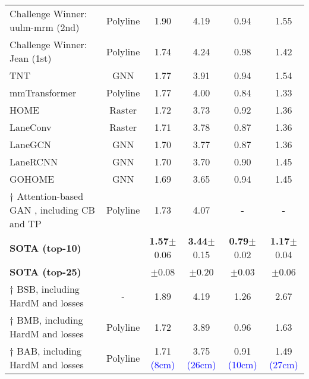 \begin{table}
{\begin{tabular}{l c c c c c}
		Challenge Winner: uulm-mrm (2nd) \cite{chang2019argoverse} & Polyline & 1.90 & 4.19 & 0.94 & 1.55 \\
		Challenge Winner: Jean (1st) \cite{mercat2020multi, chang2019argoverse} & Polyline & 1.74 & 4.24 & 0.98 & 1.42 \\
		TNT~\cite{zhao2021tnt} & \ac{GNN} & 1.77 & 3.91 & 0.94 & 1.54 \\
		mmTransformer~\cite{liu2021multimodal} & Polyline & 1.77 & 4.00 & 0.84 &  1.33 \\
		HOME~\cite{gilles2021home} & Raster & 1.72 & 3.73 & 0.92 & 1.36 \\
		LaneConv~\cite{deo2018convolutionalmotion} & Raster & 1.71 & 3.78 & 0.87 & 1.36 \\
		LaneGCN~\cite{liang2020learning} & \ac{GNN} & 1.70 & 3.77 & 0.87 & 1.36 \\
		LaneRCNN~\cite{zeng2021lanercnn} & \ac{GNN} & 1.70 & 3.70 & 0.90 & 1.45 \\
		GOHOME~\cite{gilles2022gohome} & \ac{GNN} & 1.69 & 3.65 & 0.94 & 1.45 \\
		$\dag$ Attention-based \ac{GAN} \cite{gomez2022exploring}, including CB and TP & Polyline & 1.73 & 4.07 & - & - \\
		\textbf{\ac{SOTA} (top-10)}~\cite{gilles2022gohome, liu2021multimodal, varadarajan2022multipath++, ye2021tpcn} &  & \textbf{1.57}$\pm$0.06 &  \textbf{3.44}$\pm$0.15 & \textbf{0.79}$\pm$0.02 & \textbf{1.17}$\pm$0.04  \\
		\textbf{\ac{SOTA} (top-25)}~\cite{gilles2022gohome, liu2021multimodal, varadarajan2022multipath++, ye2021tpcn} &  & \boldblue{1.63}$\pm$0.08 & \boldblue{3.59}$\pm$0.20 & \boldblue{0.81}$\pm$0.03 & \boldblue{1.22}$\pm$0.06  \\
		\midrule
		$\dag$ \ac{BSB}, including \ac{HardM} and losses & - & 1.89 & 4.19 & 1.26 & 2.67 \\
		$\dag$ \ac{BMB}, including \ac{HardM} and losses & Polyline & 1.72  & 3.89 & 0.96 & 1.63 \\
		$\dag$ \ac{BAB}, including \ac{HardM} and losses & Polyline & 
		1.71 {\scriptsize{\textcolor{blue}{(8cm)}}} & 3.75 {\scriptsize{\textcolor{blue}{(26cm)}}} & 0.91 {\scriptsize{\textcolor{blue}{(10cm)}}} & 1.49 {\scriptsize{\textcolor{blue}{(27cm)}}} \\
		\bottomrule
	\end{tabular}}
	\label{table:6_results_test}
\end{table}

